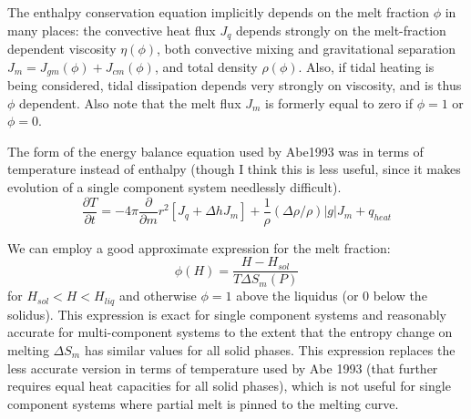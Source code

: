 The enthalpy conservation equation implicitly depends on the melt fraction $\phi$ in many places: the convective heat flux $J_q$ depends strongly on the melt-fraction dependent viscosity $\eta(\phi)$, both convective mixing and gravitational separation ${J_m = J_{gm}(\phi) + J_{cm}(\phi)}$, and total density $\rho(\phi)$.
Also, if tidal heating is being considered, tidal dissipation depends very strongly on viscosity, and is thus $\phi$ dependent.
Also note that the melt flux $J_m$ is formerly equal to zero if $\phi=1$ or $\phi=0$.

The form of the energy balance equation used by Abe1993 was in terms of temperature instead of enthalpy (though I think this is less useful, since it makes evolution of a single component system needlessly difficult).
\begin{equation}
  [C_p  + \Delta h (\frac{\partial \phi}{\partial T})_P] \frac{\partial T}{\partial t}= - 4\pi \frac{\partial}{\partial m} r^2[J_q + \Delta h J_m] + \frac{1}{\rho}(\Delta \rho/\rho)|g|J_m + q_{heat}
\end{equation}


We can employ a good approximate expression for the melt fraction:
\begin{equation}
  \phi(H) = \frac{H - H_{sol}}{T\Delta S_m(P)} 
\end{equation}
for $H_{sol} < H < H_{liq}$ and otherwise $\phi = 1$ above the liquidus (or 0 below the solidus).
This expression is exact for single component systems and reasonably accurate for multi-component systems to the extent that the entropy change on melting $\Delta S_m$ has similar values for all solid phases.
This expression replaces the less accurate version in terms of temperature used by Abe 1993 (that further requires equal heat capacities for all solid phases), which is not useful for single component systems where partial melt is pinned to the melting curve.

